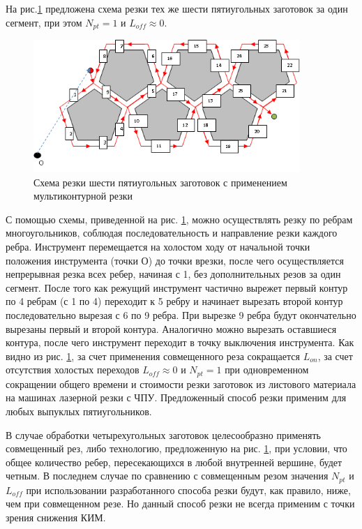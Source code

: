 \documentclass[11pt,twoside]{report}
\begin{document}
На рис.\ref{5-1}
предложена схема резки тех же шести
пятиугольных заготовок за один сегмент, при этом  $N_{pt}=1$
и $L_{off} \approx 0$.

\begin{figure}
  \begin{center}
  \includegraphics[width=0.9\textwidth]{5-1.png}
  \caption{Схема резки шести пятиугольных заготовок
  с применением мультиконтурной резки}
  \label{5-1}
  \end{center}
\end{figure}

С помощью схемы, приведенной на рис. \ref{5-1},
можно осуществлять резку по ребрам многоугольников,
соблюдая последовательность и направление резки каждого ребра.
Инструмент перемещается на холостом ходу от
начальной точки положения инструмента
(точки О)
до точки врезки, после чего осуществляется непрерывная резка всех ребер,
начиная с 1, без дополнительных резов за один сегмент.
После того как режущий инструмент частично вырежет
первый контур по 4 ребрам (с 1 по 4)
переходит к 5 ребру и начинает вырезать
второй контур последовательно вырезая с 6 по 9 ребра.
При вырезке 9 ребра будут окончательно
вырезаны первый и второй контура.
Аналогично можно вырезать оставшиеся контура,
после чего инструмент переходит в точку выключения инструмента.
Как видно из рис. \ref{5-1},
за счет применения совмещенного реза сокращается $L_{on}$,
за счет отсутствия холостых переходов
$L_{off} \approx 0$
и $N_{pt}=1$
при одновременном сокращении общего времени
и стоимости резки заготовок из листового
материала на машинах лазерной резки с ЧПУ.
Предложенный способ резки применим для любых выпуклых пятиугольников.

В случае обработки четырехугольных заготовок
целесообразно применять совмещенный рез,
либо технологию, предложенную на рис. \ref{5-1},
при условии, что общее количество ребер,
пересекающихся в любой внутренней вершине, будет четным.
В последнем случае по сравнению с совмещенным резом значения
$N_{pt}$
и $L_{off}$
при использовании разработанного способа резки будут,
как правило, ниже, чем при совмещенном резе.
Но данный способ резки не всегда применим
с точки зрения снижения КИМ.
\end{document}
